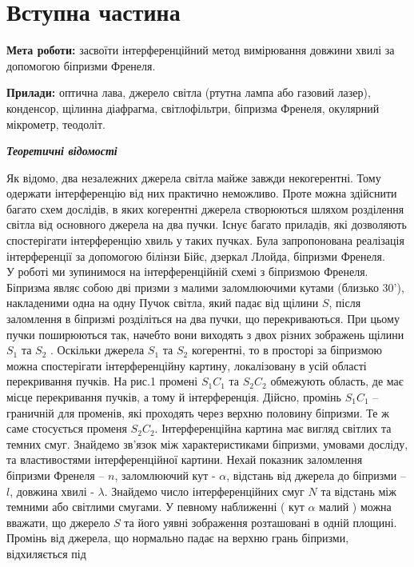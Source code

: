 \section{Вступна частина}
\setlength{\parindent}{4em}
\indent \textbf{Мета роботи:} засвоїти інтерференційний метод вимірювання довжини хвилі за допомогою
біпризми Френеля. \par
\textbf{Прилади:} оптична лава, джерело світла (ртутна лампа або газовий лазер), конденсор, щілинна діафрагма, світлофільтри, біпризма Френеля, окулярний мікрометр,
теодоліт.
\begin{center}
\textbf{\emph{Теоретичні відомості}}
\end{center}
\indent Як відомо, два незалежних джерела світла майже завжди некогерентні. Тому одержати інтерференцію від них практично неможливо. Проте можна здійснити багато схем дослідів, в
яких когерентні джерела створюються шляхом розділення світла від основного джерела на два пучки. Існує багато приладів, які дозволяють спостерігати інтерференцію хвиль у таких пучках. Була запропонована реалізація інтерференції за допомогою білінзи Бійє, дзеркал Ллойда,
біпризми Френеля.\\
 У роботі ми зупинимося на інтерференційній схемі з біпризмою Френеля. Біпризма являє собою дві призми з малими заломлюючими кутами (близько $30’$), накладеними одна на одну
 Пучок світла, який падає від щілини $S$, після заломлення в біпризмі розділіться на два пучки, що перекриваються. При цьому пучки поширюються так, начебто вони виходять з двох
різних зображень щілини $S_1$ та $S_2$ . Оскільки джерела $S_1$ та $S_2$ когерентні, то в просторі за біпризмою можна спостерігати інтерференційну картину, локалізовану в усій області перекривання пучків. На рис.1 промені $S_1C_1$ та $S_2C_2$ обмежують область, де має місце перекривання пучків, а тому й інтерференція. Дійсно, промінь $S_1C_1$ –граничній для променів, які проходять через верхню половину біпризми. Те ж саме стосується променя $S_2C_2$.
Інтерференційна картина має вигляд світлих та темних смуг. Знайдемо зв’язок між характеристиками біпризми, умовами досліду, та властивостями інтерференційної картини. Нехай
показник заломлення біпризми Френеля – $n$, заломлюючий кут - $\alpha$, відстань від джерела до біпризми – $l$, довжина хвилі - $\lambda$. Знайдемо число інтерференційних смуг $N$ та відстань між
темними або світлими смугами. У певному наближенні ( кут $\alpha$ малий ) можна вважати, що
джерело $S$ та його уявні зображення розташовані в одній площині.
 Промінь від джерела, що нормально падає на верхню грань біпризми, відхиляється під
